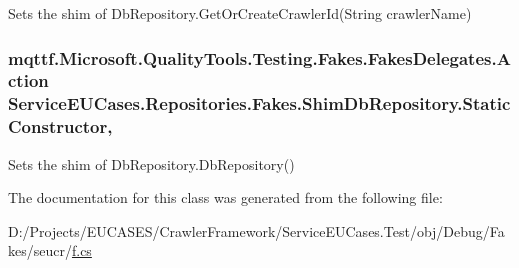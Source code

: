 Sets the shim of Db\-Repository.\-Get\-Or\-Create\-Crawler\-Id(\-String crawler\-Name)

\hypertarget{class_service_e_u_cases_1_1_repositories_1_1_fakes_1_1_shim_db_repository_ab30092be628ae1c64792888680dcee12}{
\subsubsection[{Static\-Constructor}]{\setlength{\rightskip}{0pt plus 5cm}mqttf.\-Microsoft.\-Quality\-Tools.\-Testing.\-Fakes.\-Fakes\-Delegates.\-Action Service\-E\-U\-Cases.\-Repositories.\-Fakes.\-Shim\-Db\-Repository.\-Static\-Constructor\hspace{0.3cm}{\ttfamily [static]}, {\ttfamily [set]}}}\label{class_service_e_u_cases_1_1_repositories_1_1_fakes_1_1_shim_db_repository_ab30092be628ae1c64792888680dcee12}


Sets the shim of Db\-Repository.\-Db\-Repository()



The documentation for this class was generated from the following file\-:\begin{DoxyCompactItemize}
\item 
D\-:/\-Projects/\-E\-U\-C\-A\-S\-E\-S/\-Crawler\-Framework/\-Service\-E\-U\-Cases.\-Test/obj/\-Debug/\-Fakes/seucr/\hyperlink{seucr_2f_8cs}{f.\-cs}\end{DoxyCompactItemize}
